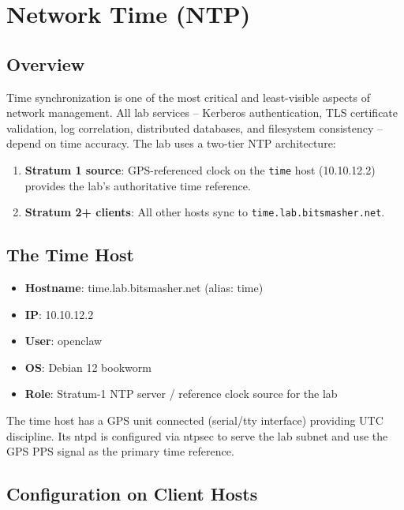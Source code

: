 \section{Network Time (NTP)}

\subsection{Overview}

Time synchronization is one of the most critical and least-visible aspects of network management. All lab services -- Kerberos authentication, TLS certificate validation, log correlation, distributed databases, and filesystem consistency -- depend on time accuracy. The lab uses a two-tier NTP architecture:

\begin{enumerate}
    \item \textbf{Stratum 1 source}: GPS-referenced clock on the \texttt{time} host (10.10.12.2) provides the lab's authoritative time reference.
    
    \item \textbf{Stratum 2+ clients}: All other hosts sync to \texttt{time.lab.bitsmasher.net}.
\end{enumerate}

\subsection{The Time Host}

\begin{itemize}
    \item \textbf{Hostname}: time.lab.bitsmasher.net (alias: time)
    
    \item \textbf{IP}: 10.10.12.2
    
    \item \textbf{User}: openclaw
    
    \item \textbf{OS}: Debian 12 bookworm
    
    \item \textbf{Role}: Stratum-1 NTP server / reference clock source for the lab
\end{itemize}

The time host has a GPS unit connected (serial/tty interface) providing UTC discipline. Its ntpd is configured via ntpsec to serve the lab subnet and use the GPS PPS signal as the primary time reference.

\subsection{Configuration on Client Hosts}

